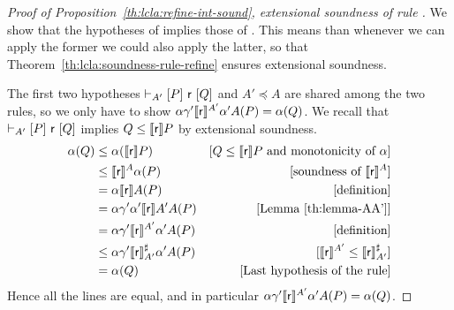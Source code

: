 \begin{proof}[Proof of Proposition~\ref{th:lcla:refine-int-sound}, extensional soundness of rule ]
	We show that the hypotheses of  implies those of . This means than whenever we can apply the former we could also apply the latter, so that Theorem~\ref{th:lcla:soundness-rule-refine} ensures extensional soundness.
	
	The first two hypotheses $\vdash_{A'}\nobreak[P]~\mathsf{r}~[Q]$ and $A' \preceq A$ are shared among the two rules, so we only have to show $\alpha \gamma' \llbracket\mathsf{r}\rrbracket^{A'} \alpha' A(P) = \alpha(Q)$. We recall that $\vdash_{A'}\nobreak[P]~\mathsf{r}~[Q]$ implies $Q \le \llbracket\mathsf{r}\rrbracket P$ by extensional soundness.
	\begin{align*}
		\alpha(Q) &\le \alpha(\llbracket\mathsf{r}\rrbracket P ) &[Q \le \llbracket\mathsf{r}\rrbracket P \text{ and monotonicity of }\alpha] \\
		&\le \llbracket\mathsf{r}\rrbracket^{A} \alpha(P) &[\text{soundness of }\llbracket\mathsf{r}\rrbracket^{A}] \\
		&= \alpha \llbracket\mathsf{r}\rrbracket A(P) &[\text{definition}] \\
		&= \alpha \gamma' \alpha' \llbracket\mathsf{r}\rrbracket A' A(P) &[\text{Lemma~\ref{th:lemma-AA'}}] \\
		&= \alpha \gamma' \llbracket\mathsf{r}\rrbracket^{A'} \alpha' A(P) &[\text{definition}] \\
		&\le \alpha \gamma' \llbracket\mathsf{r}\rrbracket^{\sharp}_{A'} \alpha' A(P) &[\llbracket\mathsf{r}\rrbracket^{A'} \le \llbracket\mathsf{r}\rrbracket^{\sharp}_{A'}] \\
		&= \alpha(Q) &[\text{Last hypothesis of the rule}]
	\end{align*}
	Hence all the lines are equal, and in particular $\alpha \gamma' \llbracket\mathsf{r}\rrbracket^{A'} \alpha' A(P) = \alpha(Q)$.
\end{proof}

